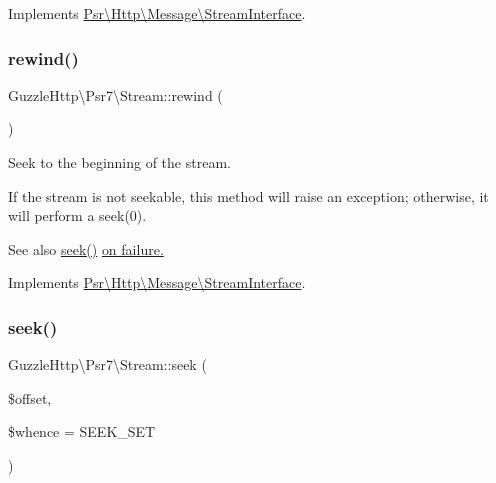 Implements \hyperlink{interfacePsr_1_1Http_1_1Message_1_1StreamInterface_ad41b4afe827e179dfb4b988e98cccb12}{Psr\textbackslash{}\+Http\textbackslash{}\+Message\textbackslash{}\+Stream\+Interface}.

\mbox{\label{classGuzzleHttp_1_1Psr7_1_1Stream_abe54d2885cbc219347016c3ccfed1055}} 
\subsubsection{\texorpdfstring{rewind()}{rewind()}}
{\footnotesize\ttfamily Guzzle\+Http\textbackslash{}\+Psr7\textbackslash{}\+Stream\+::rewind (\begin{DoxyParamCaption}{ }\end{DoxyParamCaption})}

Seek to the beginning of the stream.

If the stream is not seekable, this method will raise an exception; otherwise, it will perform a seek(0).

\begin{DoxySeeAlso}{See also}
\hyperlink{classGuzzleHttp_1_1Psr7_1_1Stream_abf9d99bb0f70f34723dbfeb80678ad79}{seek()} \hyperlink{}{on failure. }
\end{DoxySeeAlso}


Implements \hyperlink{interfacePsr_1_1Http_1_1Message_1_1StreamInterface_a48721ef4d5097250a3f94515938393c9}{Psr\textbackslash{}\+Http\textbackslash{}\+Message\textbackslash{}\+Stream\+Interface}.

\mbox{\label{classGuzzleHttp_1_1Psr7_1_1Stream_abf9d99bb0f70f34723dbfeb80678ad79}} 
\subsubsection{\texorpdfstring{seek()}{seek()}}
{\footnotesize\ttfamily Guzzle\+Http\textbackslash{}\+Psr7\textbackslash{}\+Stream\+::seek (\begin{DoxyParamCaption}\item[{}]{\$offset,  }\item[{}]{\$whence = {\ttfamily SEEK\+\_\+SET} }\end{DoxyParamCaption})}

